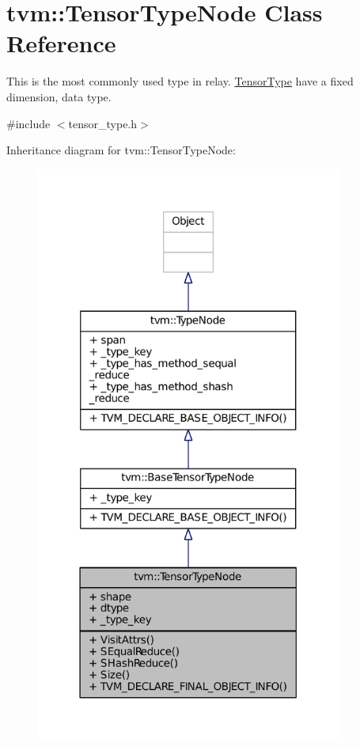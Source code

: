 \hypertarget{classtvm_1_1TensorTypeNode}{}\section{tvm\+:\+:Tensor\+Type\+Node Class Reference}
\label{classtvm_1_1TensorTypeNode}


This is the most commonly used type in relay. \hyperlink{classtvm_1_1TensorType}{Tensor\+Type} have a fixed dimension, data type.  




{\ttfamily \#include $<$tensor\+\_\+type.\+h$>$}



Inheritance diagram for tvm\+:\+:Tensor\+Type\+Node\+:
\nopagebreak
\begin{figure}[H]
\begin{center}
\leavevmode
\includegraphics[width=285pt]{classtvm_1_1TensorTypeNode__inherit__graph}
\end{center}
\end{figure}


